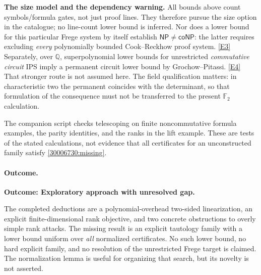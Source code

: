 \documentclass[11pt,a4paper]{article}
\newcommand{\Q}{\mathbb{Q}}
\newcommand{\eref}[2]{\hyperlink{extra:#1:#2}{[E#2]}}
\numberwithin{equation}{section}
\begin{document}
\textbf{The size model and the dependency warning.}
All bounds above count symbols/formula gates, not just proof lines. They
therefore pursue the size option in the catalogue; no line-count lower bound
is inferred. Nor does a lower bound for this particular Frege system by
itself establish $\mathsf{NP}\ne\mathsf{coNP}$: the latter requires excluding
\emph{every} polynomially bounded Cook--Reckhow proof system.
\eref{30006730}{3} Separately, over $\Q$, superpolynomial lower bounds for unrestricted
\emph{commutative circuit} IPS imply a permanent circuit lower bound by
Grochow--Pitassi. \eref{30006730}{4} That stronger route is not assumed here.
The field qualification matters: in characteristic two the permanent
coincides with the determinant, so that formulation of the consequence
must not be transferred to the present $\mathbb F_2$ calculation.

The companion script checks telescoping on finite noncommutative formula
examples, the parity identities, and the ranks in the lift example. These
are tests of the stated calculations, not evidence that all certificates
for an unconstructed family satisfy \eqref{30006730:missing}.

\paragraph{Outcome.}
\textbf{Outcome: Exploratory approach with unresolved gap.}

The completed deductions are a polynomial-overhead two-sided linearization,
an explicit finite-dimensional rank objective, and two concrete obstructions
to overly simple rank attacks. The missing result is an explicit tautology
family with a lower bound uniform over \emph{all} normalized certificates.
No such lower bound, no hard explicit family, and no resolution of the
unrestricted Frege target is claimed. The normalization lemma is useful for
organizing that search, but its novelty is not asserted.
\end{document}
